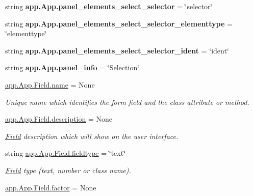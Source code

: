 \begin{DoxyCompactItemize}
\mbox{\label{group___g_u_i_ga4baf1be9e6d444e67d433561465f100c}} 
string {\bfseries app.\+App.\+panel\+\_\+elements\+\_\+select\+\_\+selector} = \char`\"{}selector\char`\"{}
\item 
\mbox{\label{group___g_u_i_gab77614285ffc4bfdfddc6788f4897106}} 
string {\bfseries app.\+App.\+panel\+\_\+elements\+\_\+select\+\_\+selector\+\_\+elementtype} = \char`\"{}elementtype\char`\"{}
\item 
\mbox{\label{group___g_u_i_gacb8c6bb972459d6b46312055c4f57bb6}} 
string {\bfseries app.\+App.\+panel\+\_\+elements\+\_\+select\+\_\+selector\+\_\+ident} = \char`\"{}ident\char`\"{}
\item 
\mbox{\label{group___g_u_i_ga613c54adc3f3fe8e856b83cdbf9d3a10}} 
string {\bfseries app.\+App.\+panel\+\_\+info} = \char`\"{}Selection\char`\"{}
\item 
\hyperlink{group___g_u_i_ga74bf1ee16d2de49ee707cab9ecba123b}{app.\+App.\+Field.\+name} = None
\begin{DoxyCompactList}\small\item\em Unique name which identifies the form field and the class attribute or method. \end{DoxyCompactList}\item 
\hyperlink{group___g_u_i_gadd42fca0c131874daa29902266d514cd}{app.\+App.\+Field.\+description} = None
\begin{DoxyCompactList}\small\item\em \hyperlink{classapp_1_1_app_1_1_field}{Field} description which will show on the user interface. \end{DoxyCompactList}\item 
string \hyperlink{group___g_u_i_ga2b84546c227ee521e1a4776cd07aabe8}{app.\+App.\+Field.\+fieldtype} = \char`\"{}text\char`\"{}
\begin{DoxyCompactList}\small\item\em \hyperlink{classapp_1_1_app_1_1_field}{Field} type (text, number or class name). \end{DoxyCompactList}\item 
\mbox{\label{group___g_u_i_ga6a50e1c443b963d286ed393be38e00fd}} 
\hyperlink{group___g_u_i_ga6a50e1c443b963d286ed393be38e00fd}{app.\+App.\+Field.\+factor} = None

\end{DoxyCompactItemize}

